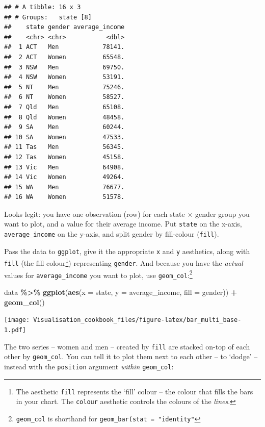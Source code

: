 \documentclass[
]{book}
\newenvironment{Shaded}{\begin{snugshade}}{\end{snugshade}}
\newcommand{\DataTypeTok}[1]{\textcolor[rgb]{0.13,0.29,0.53}{#1}}
\newcommand{\KeywordTok}[1]{\textcolor[rgb]{0.13,0.29,0.53}{\textbf{#1}}}
\newcommand{\NormalTok}[1]{#1}
\newcommand{\OperatorTok}[1]{\textcolor[rgb]{0.81,0.36,0.00}{\textbf{#1}}}
\newcommand{\StringTok}[1]{\textcolor[rgb]{0.31,0.60,0.02}{#1}}
\begin{document}
\begin{verbatim}
## # A tibble: 16 x 3
## # Groups:   state [8]
##    state gender average_income
##    <chr> <chr>           <dbl>
##  1 ACT   Men            78141.
##  2 ACT   Women          65548.
##  3 NSW   Men            69750.
##  4 NSW   Women          53191.
##  5 NT    Men            75246.
##  6 NT    Women          58527.
##  7 Qld   Men            65108.
##  8 Qld   Women          48458.
##  9 SA    Men            60244.
## 10 SA    Women          47533.
## 11 Tas   Men            56345.
## 12 Tas   Women          45158.
## 13 Vic   Men            64908.
## 14 Vic   Women          49264.
## 15 WA    Men            76677.
## 16 WA    Women          51578.
\end{verbatim}

Looks legit: you have one observation (row) for each state \(\times\) gender group you want to plot, and a value for their average income. Put \texttt{state} on the x-axis, \texttt{average\_income} on the y-axis, and split gender by fill-colour (\texttt{fill}).

Pass the data to \texttt{ggplot}, give it the appropriate \texttt{x} and \texttt{y} aesthetics, along with \texttt{fill} (the fill colour\footnote{The aesthetic \texttt{fill} represents the `fill' colour -- the colour that fills the bars in your chart. The \texttt{colour} aesthetic controls the colours of the \emph{lines}.}) representing \texttt{gender}. And because you have the \emph{actual} values for \texttt{average\_income} you want to plot, use \texttt{geom\_col}:\footnote{\texttt{geom\_col} is shorthand for \texttt{geom\_bar(stat\ =\ "identity"}}

\begin{Shaded}
\begin{Highlighting}[]
\NormalTok{data }\OperatorTok{\%\textgreater{}\%}\StringTok{ }
\StringTok{  }\KeywordTok{ggplot}\NormalTok{(}\KeywordTok{aes}\NormalTok{(}\DataTypeTok{x =}\NormalTok{ state,}
             \DataTypeTok{y =}\NormalTok{ average\_income,}
             \DataTypeTok{fill =}\NormalTok{ gender)) }\OperatorTok{+}\StringTok{ }
\StringTok{  }\KeywordTok{geom\_col}\NormalTok{()}
\end{Highlighting}
\end{Shaded}

\texttt{[image: Visualisation\_cookbook\_files/figure-latex/bar\_multi\_base-1.pdf]}

The two series -- women and men -- created by \texttt{fill} are stacked on-top of each other by \texttt{geom\_col}. You can tell it to plot them next to each other -- to `dodge' -- instead with the \texttt{position} argument \emph{within} \texttt{geom\_col}:
\end{document}
